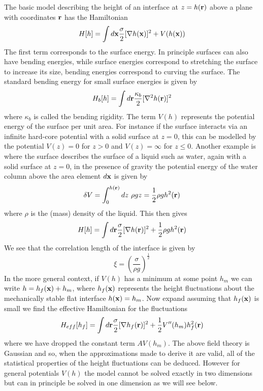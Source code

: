 The basic model describing the height of an interface at $z=h({\bf r})$ above a plane with coordinates ${\bf r}$ has the Hamiltonian 
\begin{equation}
H[h] = \int d{\bf x}\frac{\sigma}{2} [\nabla h({\bf x})]^2 + V(h({\bf x}))
\end{equation}
The first term corresponds to the surface energy. In principle surfaces can also have bending energies, while surface energies correspond to stretching the surface to increase its size, bending energies correspond to curving the surface. The standard bending energy for small surface energies \cite{diehl_interface_1980} is given by
\begin{equation}
H_b[h] = \int d{\bf r} \frac{\kappa_b}{2}[\nabla^2 h({\bf r})]^2
\end{equation} 
where $\kappa_b$ is called the bending rigidity.
The term $V(h)$  represents the potential energy of the surface per unit area. For instance if the surface interacts via an infinite hard-core potential with a solid surface at $z=0$, this can be modelled by the potential $V(z) =0$ for $z \greater 0$ and $V(z)=\infty$ for $z\leq 0$. Another example is where the surface describes the surface of a liquid such as water, again with a solid surface at $z=0$, in the presence of gravity the potential energy of the water column above the area 
element $d{\bf x}$ is given by
\begin{equation}
\delta V = \int_0^{h({\bf r})} dz\ \rho g z = \frac{1}{2}\rho g h^2({\bf r})
\end{equation}
where $\rho$ is the (mass) density of the liquid. This then gives
\begin{equation}
H[h] = \int d{\bf r} \frac{\sigma}{2}[\nabla h({\bf r})]^2 + \frac{1}{2}\rho g h^2({\bf r})
\end{equation}
We see that the correlation length of the interface is given by
\begin{equation}
\xi = \left(\frac{\sigma}{\rho g}\right)^{\frac{1}{2}}
\end{equation}
In the more general context, if $V(h)$ has a minimum at some point $h_m$ we can write $h= h_f({\bf x})+ h_m$, where $h_f({\bf x})$ represents the height fluctuations about the mechanically stable flat interface $h({\bf x})=h_m$. Now expand assuming that $h_f({\bf x})$ is
small we find the effective Hamiltonian for the fluctuations
\begin{equation}
H_{eff}[h_f] = \int d{\bf r} \frac{\sigma}{2}[\nabla h_f({\bf r})]^2 + \frac{1}{2}V''(h_m) h_f^2({\bf r})
\end{equation}
where we have dropped the constant term $AV(h_m)$. The above field theory is Gaussian and 
so, when the approximations made to derive it are valid, all of the statistical properties of the height fluctuations can be deduced. However for general potentials $V(h)$ the model cannot be solved exactly in two dimensions but can in principle be solved in one dimension as we will see below.

